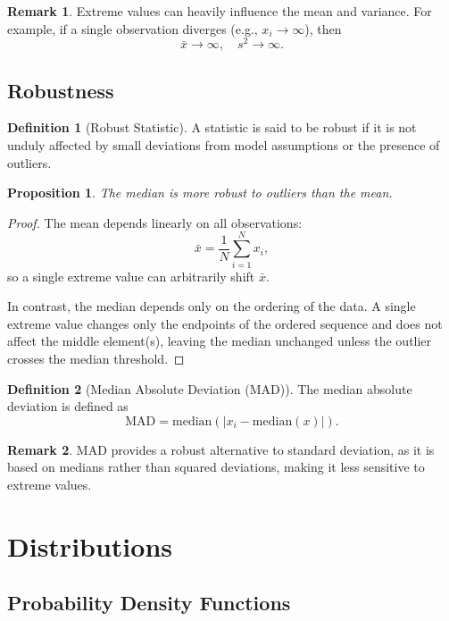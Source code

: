 \documentclass[12pt,oneside]{book}
\numberwithin{equation}{section}
\theoremstyle{definition}
\newtheorem{definition}{Definition}[section]
\newtheorem{remark}{Remark}[section]
\theoremstyle{plain}
\newtheorem{proposition}{Proposition}[section]
\theoremstyle{remark}
\newcommand{\abs}[1]{\left\lvert #1 \right\rvert}
\begin{document}
\begin{remark}
Extreme values can heavily influence the mean and variance. For example, if a single observation diverges (e.g., $x_i \to \infty$), then
\[
\bar{x} \to \infty, \quad s^2 \to \infty.
\]
\end{remark}

\section{Robustness}

\begin{definition}[Robust Statistic]
A statistic is said to be robust if it is not unduly affected by small deviations from model assumptions or the presence of outliers.
\end{definition}

\begin{proposition}
The median is more robust to outliers than the mean.
\end{proposition}

\begin{proof}
The mean depends linearly on all observations:
\[
\bar{x} = \frac{1}{N} \sum_{i=1}^N x_i,
\]
so a single extreme value can arbitrarily shift $\bar{x}$.

In contrast, the median depends only on the ordering of the data. A single extreme value changes only the endpoints of the ordered sequence and does not affect the middle element(s), leaving the median unchanged unless the outlier crosses the median threshold.
\end{proof}

\begin{definition}[Median Absolute Deviation (MAD)]
The median absolute deviation is defined as
\[
\text{MAD} = \mathrm{median} \left( \abs{x_i - \mathrm{median}(x)} \right).
\]
\end{definition}

\begin{remark}
MAD provides a robust alternative to standard deviation, as it is based on medians rather than squared deviations, making it less sensitive to extreme values.
\end{remark}

\chapter{Distributions}

\section{Probability Density Functions}
\end{document}
